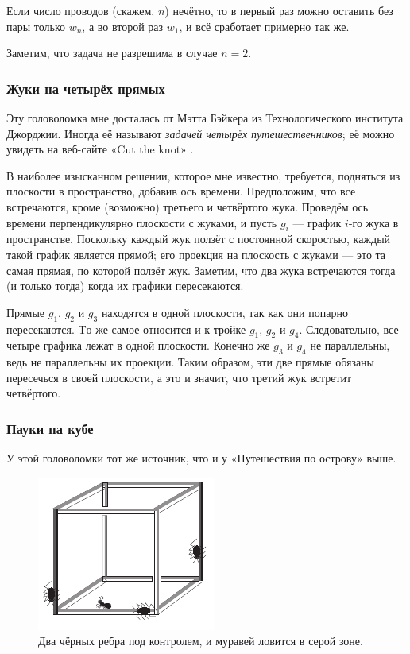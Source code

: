 Если число проводов (скажем, $n$) нечётно, то в первый раз можно оставить без пары только $w_n$, а во второй раз $w_1$, и всё сработает примерно так же.

\begin{addedbytheeditors}
Заметим, что задача не разрешима в случае $n=2$.
\end{addedbytheeditors}




\subsubsection*{Жуки на четырёх прямых}

Эту головоломка мне досталась от Мэтта Бэйкера из Технологического института Джорджии.
Иногда её называют \emph{задачей четырёх путешественников};
её можно увидеть на веб-сайте «Cut the knot» \cite{cut-the-knot}.

В наиболее изысканном решении, которое мне известно, требуется, подняться из плоскости в пространство, добавив ось времени.
Предположим, что все встречаются, кроме (возможно) третьего и четвёртого жука.
Проведём ось времени перпендикулярно плоскости с жуками, и пусть $g_i$ --- график $i$-го жука в пространстве.
Поскольку каждый жук ползёт с постоянной скоростью, каждый такой график является прямой;
его проекция на плоскость с жуками --- это та самая прямая, по которой ползёт жук.
Заметим, что два жука встречаются тогда (и только тогда) когда их графики пересекаются.

Прямые $g_1$, $g_2$ и $g_3$ находятся в одной плоскости, так как они попарно пересекаются.
Tо же самое относится и к тройке  $g_1$, $g_2$ и $g_4$.
Следовательно, все четыре графика лежат в одной плоскости.
Конечно же $g_3$ и $g_4$ не параллельны, ведь не параллельны их проекции.
Таким образом, эти две прямые обязаны пересечься в своей плоскости,
а это и значит, что третий жук встретит четвёртого.

\subsubsection*{Пауки на кубе}

У этой головоломки тот же источник, что и у «Путешествия по острову» выше.

\begin{figure}[ht!]
\centering
\includegraphics[scale=1]{pics/cube}
\caption{Два чёрных ребра под контролем, и муравей ловится в серой зоне.}
\label{pic:cube}
\end{figure}

